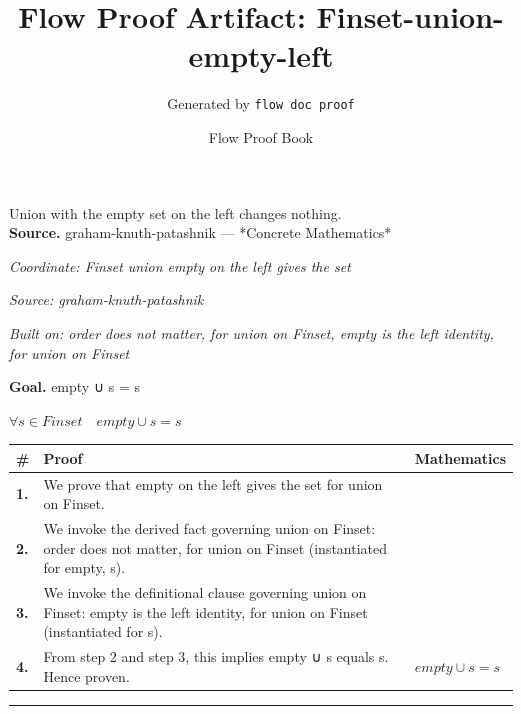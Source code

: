 \documentclass[11pt]{article}
\title{Flow Proof Artifact: Finset-union-empty-left}
\author{Generated by \texttt{flow doc proof}}
\date{Flow Proof Book}
\theoremstyle{definition}
\begin{document}
\maketitle
Union with the empty set on the left changes nothing.\\[0.5em]
\textbf{Source.} graham-knuth-patashnik — *Concrete Mathematics*\\[0.5em]
\bigskip
{}\par
\smallskip\noindent\textit{Coordinate: Finset \cdot union \cdot empty on the left gives the set}\par
\smallskip\noindent\textit{Source: graham-knuth-patashnik}\par
\smallskip\noindent\textit{Built on: order does not matter, for union on Finset, empty is the left identity, for union on Finset}\par
\medskip
\noindent\textbf{Goal.} empty ∪ s = s\par
\noindent$\displaystyle \forall s \in Finset\quad empty ∪ s = s$\par
\medskip
\noindent
\begin{tabular}{@{} >{\raggedright\arraybackslash}p{} >{\raggedright\arraybackslash}p{} >{\raggedleft\arraybackslash}p{} @{}}
\textbf{\#} & \textbf{Proof} & \textbf{Mathematics} \\
\midrule
\textbf{1.} & We prove that empty on the left gives the set for union on Finset. & \\[0.45em]
\textbf{2.} & We invoke the derived fact governing union on Finset: order does not matter, for union on Finset (instantiated for empty, s). & \\[0.45em]
\textbf{3.} & We invoke the definitional clause governing union on Finset: empty is the left identity, for union on Finset (instantiated for s). & \\[0.45em]
\textbf{4.} & From step 2 and step 3, this implies empty ∪ s equals s. Hence proven. & $\displaystyle empty ∪ s = s$ \\[0.45em]
\bottomrule
\end{tabular}
\label{thm:Finset-union-empty_on_the_left_gives_the_set}
\par\medskip\hrule
\end{document}
